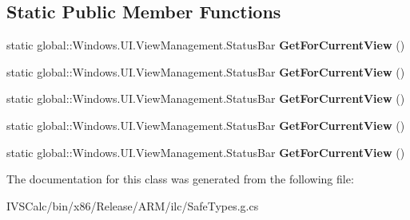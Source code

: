 \subsection*{Static Public Member Functions}
\begin{DoxyCompactItemize}
\item 
\mbox{\label{class_windows_1_1_u_i_1_1_view_management_1_1_status_bar_a64847dc9cab88478e6aa7abfbf694e70}} 
static global\+::\+Windows.\+U\+I.\+View\+Management.\+Status\+Bar {\bfseries Get\+For\+Current\+View} ()
\item 
\mbox{\label{class_windows_1_1_u_i_1_1_view_management_1_1_status_bar_a64847dc9cab88478e6aa7abfbf694e70}} 
static global\+::\+Windows.\+U\+I.\+View\+Management.\+Status\+Bar {\bfseries Get\+For\+Current\+View} ()
\item 
\mbox{\label{class_windows_1_1_u_i_1_1_view_management_1_1_status_bar_a64847dc9cab88478e6aa7abfbf694e70}} 
static global\+::\+Windows.\+U\+I.\+View\+Management.\+Status\+Bar {\bfseries Get\+For\+Current\+View} ()
\item 
\mbox{\label{class_windows_1_1_u_i_1_1_view_management_1_1_status_bar_a64847dc9cab88478e6aa7abfbf694e70}} 
static global\+::\+Windows.\+U\+I.\+View\+Management.\+Status\+Bar {\bfseries Get\+For\+Current\+View} ()
\item 
\mbox{\label{class_windows_1_1_u_i_1_1_view_management_1_1_status_bar_a64847dc9cab88478e6aa7abfbf694e70}} 
static global\+::\+Windows.\+U\+I.\+View\+Management.\+Status\+Bar {\bfseries Get\+For\+Current\+View} ()
\end{DoxyCompactItemize}


The documentation for this class was generated from the following file\+:\begin{DoxyCompactItemize}
\item 
I\+V\+S\+Calc/bin/x86/\+Release/\+A\+R\+M/ilc/Safe\+Types.\+g.\+cs\end{DoxyCompactItemize}
